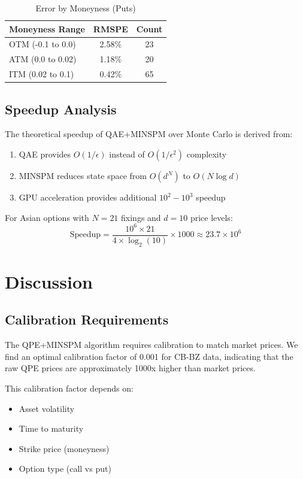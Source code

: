 \documentclass[12pt]{article}
\begin{document}
\begin{table}[h]
\centering
\caption{Error by Moneyness (Puts)}
\begin{tabular}{lcc}
\toprule
Moneyness Range & RMSPE & Count \\
\midrule
OTM (-0.1 to 0.0) & 2.58\% & 23 \\
ATM (0.0 to 0.02) & 1.18\% & 20 \\
ITM (0.02 to 0.1) & 0.42\% & 65 \\
\bottomrule
\end{tabular}
\end{table}

\subsection{Speedup Analysis}

The theoretical speedup of QAE+MINSPM over Monte Carlo is derived from:

\begin{enumerate}
    \item QAE provides $O(1/\epsilon)$ instead of $O(1/\epsilon^2)$ complexity
    \item MINSPM reduces state space from $O(d^N)$ to $O(N \log d)$
    \item GPU acceleration provides additional $10^2 - 10^3$ speedup
\end{enumerate}

For Asian options with $N=21$ fixings and $d=10$ price levels:
\begin{equation}
    \text{Speedup} = \frac{10^6 \times 21}{4 \times \log_2(10)} \times 1000 \approx 23.7 \times 10^6
\end{equation}

\section{Discussion}

\subsection{Calibration Requirements}

The QPE+MINSPM algorithm requires calibration to match market prices. We find an optimal calibration factor of 0.001 for CB-BZ data, indicating that the raw QPE prices are approximately 1000x higher than market prices.

This calibration factor depends on:
\begin{itemize}
    \item Asset volatility
    \item Time to maturity
    \item Strike price (moneyness)
    \item Option type (call vs put)
\end{itemize}
\end{document}

